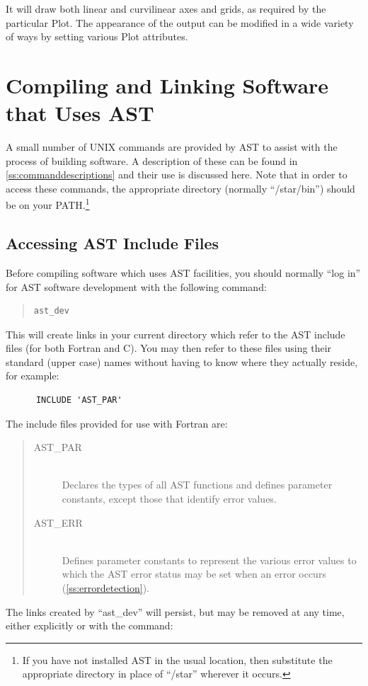 \documentclass[twoside,11pt]{article}
\newcommand{\htmlref}[2]{#1}
\newcommand{\appref}[1]{Appendix~\ref{#1}}
\newcommand{\secref}[1]{\S\ref{#1}}
\renewcommand{\appref}[1]{\ref{#1}}
\renewcommand{\secref}[1]{\ref{#1}}
\begin{document}
It will draw both linear and curvilinear axes and grids, as required
by the particular Plot. The appearance of the output can be modified
in a wide variety of ways by setting various Plot attributes.

\cleardoublepage
\section{Compiling and Linking Software that Uses AST}

A small number of UNIX commands are provided by AST to assist with the
process of building software. A description of these can be found in
\appref{ss:commanddescriptions} and their use is discussed here.  Note
that in order to access these commands, the appropriate directory
(normally ``/star/bin'') should be on your PATH.\footnote{If you have
not installed AST in the usual location, then substitute the
appropriate directory in place of ``/star'' wherever it occurs.}

\subsection{\label{ss:accessingheaderfile}Accessing AST Include Files}

Before compiling software which uses AST facilities, you should
normally ``log in'' for AST software development with the following
command:

\begin{quote}
\small
\begin{verbatim}
ast_dev
\end{verbatim}
\normalsize
\end{quote}

This will create links in your current directory which refer to the
AST include files (for both Fortran and C).
You may then refer to these files using their standard (upper case)
names without having to know where they actually reside, for example:

\small
\begin{verbatim}
      INCLUDE 'AST_PAR'
\end{verbatim}
\normalsize

The include files provided for use with Fortran are:

\begin{quote}
\begin{description}
\item[AST\_PAR]\mbox{}\\
Declares the types of all AST functions and defines parameter
constants, except those that identify error values.

\item[AST\_ERR]\mbox{}\\
Defines parameter constants to represent the various error values to
which the AST error status may be set when an error occurs
(\secref{ss:errordetection}).
\end{description}
\end{quote}
The links created by ``\htmlref{ast\_dev}{ast_dev}'' will persist, but may be removed at
any time, either explicitly or with the command:
\end{document}
